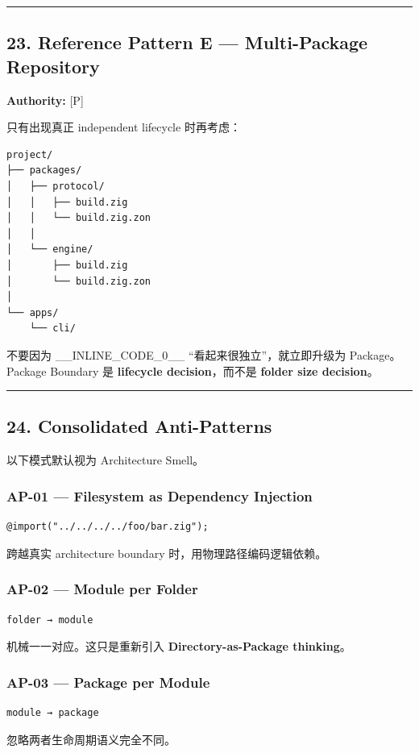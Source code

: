 \documentclass[11pt,a4paper]{article}
\begin{document}
\vspace{0.5em}\hrule\vspace{0.5em}
\subsection{23. Reference Pattern E — Multi-Package Repository}
\textbf{Authority:} [P]

只有出现真正 independent lifecycle 时再考虑：

\begin{lstlisting}[language=text]
project/
├── packages/
│   ├── protocol/
│   │   ├── build.zig
│   │   └── build.zig.zon
│   │
│   └── engine/
│       ├── build.zig
│       └── build.zig.zon
│
└── apps/
    └── cli/
\end{lstlisting}
不要因为 \_\_INLINE\_CODE\_0\_\_ “看起来很独立”，就立即升级为 Package。Package Boundary 是 \textbf{lifecycle decision}，而不是 \textbf{folder size decision}。

\vspace{0.5em}\hrule\vspace{0.5em}
\subsection{24. Consolidated Anti-Patterns}
以下模式默认视为 Architecture Smell。

\subsubsection{AP-01 — Filesystem as Dependency Injection}
\begin{lstlisting}[language=zig]
@import("../../../../foo/bar.zig");
\end{lstlisting}
跨越真实 architecture boundary 时，用物理路径编码逻辑依赖。

\subsubsection{AP-02 — Module per Folder}
\begin{lstlisting}[language=text]
folder → module
\end{lstlisting}
机械一一对应。这只是重新引入 \textbf{Directory-as-Package thinking}。

\subsubsection{AP-03 — Package per Module}
\begin{lstlisting}[language=text]
module → package
\end{lstlisting}
忽略两者生命周期语义完全不同。
\end{document}
